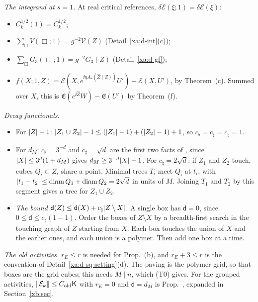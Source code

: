 \begin{detail}\label{xa:d-decay}
\emph{The integrand at $s=1$.} At real critical references, $\delta\mathcal E(\xi;1)=\delta\mathcal E(\xi)$:
\begin{itemize}
\item $C_k^{1/2}(1)=C_k^{1/2}$;
\item $\sum_\Box V(\Box;1)=g^{-2}\mathcal V(Z)$ (Detail~\ref{xa:d-int}(c));
\item $\sum_\Box G_3(\Box;1)=g^{-2}G_3(Z)$ (Detail~\ref{xa:d-gf});
\item $f(X;1,Z)=\mathcal E(X,e^{\ii\eta A_*(\hat Z(Z))}U')-\mathcal E(X,U')$, by Theorem~(c). Summed over $X$, this is $\mathfrak E(e^{\ii\hat Z}W)-\mathfrak E(U')$ by Theorem~(f).
\end{itemize}

\emph{Decay functionals.}
\begin{itemize}
\item For $\lvert Z\rvert-1$: $\lvert Z_1\cup Z_2\rvert-1\le(\lvert Z_1\rvert-1)+(\lvert Z_2\rvert-1)+1$, so $c_\flat=c_\sharp=c_\natural=1$.
\item For $d_M$: $c_\flat=3^{-d}$ and $c_\sharp=\sqrt d$ are the first two facts of , since $\lvert X\rvert\le3^d(1+d_M)$ gives $d_M\ge3^{-d}\lvert X\rvert-1$. For $c_\natural=2\sqrt d$: if $Z_1$ and $Z_2$ touch, cubes $Q_i\subset Z_i$ share a point. Minimal trees $T_i$ meet $Q_i$ at $t_i$, with $\lvert t_1-t_2\rvert\le\operatorname{diam}Q_1+\operatorname{diam}Q_2=2\sqrt d$ in units of $M$. Joining $T_1$ and $T_2$ by this segment gives a tree for $Z_1\cup Z_2$.
\item \emph{The bound $\mathsf d(Z)\le\mathsf d(X)+c_\natural\lvert Z\setminus X\rvert$.} A single box has $\mathsf d=0$, since $0\le\mathsf d\le c_\sharp(1-1)$. Order the boxes of $Z\setminus X$ by a breadth-first search in the touching graph of $Z$ starting from $X$. Each box touches the union of $X$ and the earlier ones, and each union is a polymer. Then add one box at a time.
\end{itemize}

\emph{The old activities.} $r_E\le r$ is needed for Prop.~(b), and $r_E+3\le r$ is the convention of Detail~\ref{xa:d-sq-setting}(d). The paving is the polymer grid, so that boxes are the grid cubes; this needs $M\mid n$, which (T0) gives. For the grouped activities, $\lVert\mathcal E_k\rVert\le C_{\rm old}\mathsf K$ with $r_E=0$ and $\mathsf d=d_M$ is Prop.~, expanded in Section~\ref{xb:sec}.
\end{detail}

